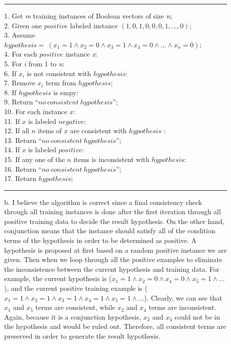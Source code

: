 \begin{enumerate}
\begin{enumerate}
	\noindent\rule[0.5ex]{\linewidth}{1pt}
	1.    Get \emph{m} training instances of Boolean vectors of size \emph{n}; \\
	2.    Given one $positive$ labeled instance $(1, 0, 1, 0, 0, 0, 1, ..., 0)$;\\
	3.    Assume $hypothesis  =\ (x_{1} = 1 \land x_{2} = 0 \land x_{3} = 1 \land x_{4} = 0 \land ... \land x_{n}=0)$; \\
	4.    For each $positive$ instance \emph{x}: \\
	5.   \qquad For \emph{i} from 1 to \emph{n}: \\
	6.   \qquad \qquad If $x_i$ is not consistent with $hypothesis$: \\
	7.   \qquad \qquad \qquad Remove $x_i$ term from $hypothesis$; \\
	8.    If $hypothesis$ is empy: \\
	9.   \qquad Return \enquote{$no\> consistent\> hypothesis$}; \\
	10. For each  instance $x$: \\
	11. \qquad If $x$ is labeled $negative$: \\
	12. \qquad \qquad If all $n$ items of $x$ are consistent with $hypothesis$ :\\
	13. \qquad \qquad \qquad Return \enquote{$no\> consistent\> hypothesis$}; \\
	14. \qquad If $x$ is labeled $positive$: \\
	15. \qquad \qquad If any one of the $n$ items is inconsistent with $hypothesis$:\\
	16. \qquad \qquad \qquad Return \enquote{$no\> consistent\> hypothesis$}; \\
	17. Return $hypothesis$; \\
	\noindent\rule[0.5ex]{\linewidth}{1pt}

	\item[b.]
	I believe the algorithm is correct since a final consistency check through all training instances is done after the first iteration through all positive training data to decide the result hypothesis. On the other hand, conjunction means that the instance should satisfy all of the condition terms of the hypothesis in order to be determined as positive. A hypothesis is proposed at first based on a random positive instance we are given. Then when we loop through all the positive examples to eliminate the inconsistence between the current hypothesis and training data. For example, the current hypothesis is ($x_1 = 1 \land x_2 = 0 \land x_4 = 0 \land x_5 = 1 \land ... $), and the current positive training example is ($ x_1 =1 \land x_2 = 1 \land x_3 = 1 \land x_4 = 1 \land x_5 = 1 \land ... $). Clearly, we can see that $x_1$  and $x_5$ terms are consistent, while $x_2$ and $x_4$ terms are inconsistent. Again, because it is a conjunction hypothesis, $x_2$ and $x_4$ could not be in the hypothesis and would be ruled out. Therefore, all consistent terms are preserved in order to generate the result hypothesis. 
	

\end{enumerate}
\end{enumerate}
